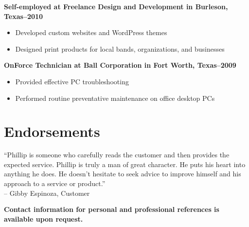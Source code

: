\documentclass[margin]{res}
\newcommand{\sectionspace}{\vspace{10pt}}
\begin{document}
\begin{resume}
                \textbf{Self-employed
                 at Freelance Design and Development in Burleson, Texas--2010}
                 \vspace{-10pt}\begin{itemize} \itemsep -2pt %
                   \item Developed custom websites and WordPress themes
                 
                   \item Designed print products for local bands, organizations, and businesses
                 \end{itemize}
              
                \textbf{OnForce Technician
                 at Ball Corporation in Fort Worth, Texas--2009}
                 \vspace{-10pt}\begin{itemize} \itemsep -2pt %
                   \item Provided effective PC troubleshooting
                 
                   \item Performed routine preventative maintenance on office desktop PCs
                 \end{itemize}
              

\sectionspace


\section{
  Endorsements
}

              
                ``Phillip is someone who carefully reads the customer and then provides the
expected service. Phillip is truly a man of great character. He puts his
heart into anything he does. He doesn't hesitate to seek advice to improve
himself and his approach to a service or product.''                    \\
                -- Gibby Espinoza, Customer
              

\sectionspace


\sectionspace


\textbf{\footnotesize
  Contact information for personal and professional references is available upon
  request.
}


\end{resume}
\end{document}
